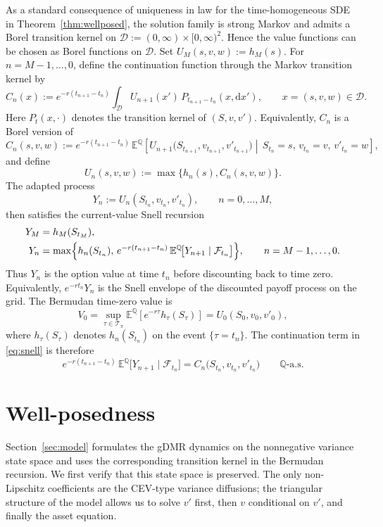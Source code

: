 \documentclass[pdflatex,sn-mathphys-num]{sn-jnl}
\theoremstyle{thmstyleone}%
\theoremstyle{thmstylethree}%
\theoremstyle{thmstyletwo}%
\newcommand{\dd}{\mathrm d}
\newcommand{\E}{\mathbb E}
\newcommand{\Q}{\mathbb Q}
\begin{document}
As a standard consequence of uniqueness in law for the time-homogeneous SDE in Theorem~\ref{thm:wellposed}, the solution family is strong Markov and admits a Borel transition kernel on $\mathcal D:=(0,\infty)\times[0,\infty)^2$. Hence the value functions can be chosen as Borel functions on $\mathcal D$. Set $U_M(s,v,w):=h_M(s)$. For $n=M-1,\dots,0$, define the continuation function through the Markov transition kernel by
\[
C_n(x):=
e^{-r(t_{n+1}-t_n)}
\int_{\mathcal D} U_{n+1}(x')\,P_{t_{n+1}-t_n}(x,\dd x'),
\qquad x=(s,v,w)\in\mathcal D.
\]
Here $P_t(x,\cdot)$ denotes the transition kernel of $(S,v,v')$. Equivalently, $C_n$ is a Borel version of
\[
C_n(s,v,w)
:=e^{-r(t_{n+1}-t_n)}\,\E^\Q\!\left[
U_{n+1}\bigl(S_{t_{n+1}},v_{t_{n+1}},v'_{t_{n+1}}\bigr)
\middle|\,
S_{t_n}=s,\,v_{t_n}=v,\,v'_{t_n}=w
\right],
\]
and define
\[
U_n(s,v,w):=\max\{h_n(s),C_n(s,v,w)\}.
\]
The adapted process
\[
Y_n:=U_n(S_{t_n},v_{t_n},v'_{t_n}),\qquad n=0,\dots,M,
\]
then satisfies the current-value Snell recursion
\begin{equation}\label{eq:snell}
\begin{aligned}
Y_M&=h_M(S_{t_M}),\\
Y_n&=\max\Bigl\{h_n(S_{t_n}),\,
e^{-r(t_{n+1}-t_n)}\,
\E^\Q\!\bigl[Y_{n+1}\mid\mathcal F_{t_n}\bigr]\Bigr\},
\qquad n=M-1,\dots,0.
\end{aligned}
\end{equation}
Thus $Y_n$ is the option value at time $t_n$ before discounting back to time zero. Equivalently, $e^{-rt_n}Y_n$ is the Snell envelope of the discounted payoff process on the grid. The Bermudan time-zero value is
\[
V_0
=\sup_{\tau\in\mathcal T_\pi}\E^\Q\!\left[e^{-r\tau}h_\tau(S_\tau)\right]
=U_0(S_0,v_0,v'_0),
\]
where $h_\tau(S_\tau)$ denotes $h_n(S_{t_n})$ on the event $\{\tau=t_n\}$. The continuation term in \eqref{eq:snell} is therefore
\[
e^{-r(t_{n+1}-t_n)}\,\E^\Q\!\bigl[Y_{n+1}\mid\mathcal F_{t_n}\bigr]
=C_n\bigl(S_{t_n},v_{t_n},v'_{t_n}\bigr)\qquad\text{$\Q$-a.s.}
\]




\section{Well-posedness}\label{sec:wellposed}

Section~\ref{sec:model} formulates the gDMR dynamics on the nonnegative variance state space and uses the corresponding transition kernel in the Bermudan recursion. We first verify that this state space is preserved. The only non-Lipschitz coefficients are the CEV-type variance diffusions; the triangular structure of the model allows us to solve $v'$ first, then $v$ conditional on $v'$, and finally the asset equation.
\end{document}
